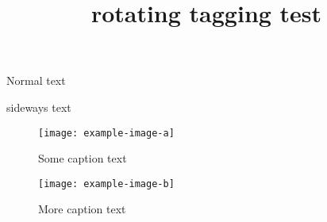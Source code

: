 \documentclass{article}
\title{rotating tagging test}
\begin{document}
Normal text

\begin{sideways}
sideways text
\end{sideways}

\begin{sidewaysfigure}
\centering
\texttt{[image: example-image-a]}
\caption{Some caption text}
\end{sidewaysfigure}

\begin{figure}
\centering
\texttt{[image: example-image-b]}
\caption{More caption text}
\end{figure}
\end{document}

